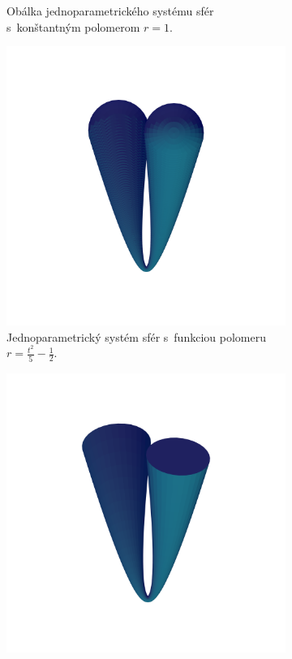 \begin{figure}[h]
\begin{subfigure}[t]{0.49\textwidth}
		\caption{Obálka jednoparametrického systému sfér s~konštantným polomerom $r=1$.}
        \label{fig:plocha2}
    \end{subfigure}
    \hfill
    \begin{subfigure}[t]{0.49\textwidth}
        \centering
        \includegraphics[width=\textwidth, trim=0mm 50mm 0mm 50mm, clip=true]{images/bienert_function_radius_spheres.png}
        	\caption{Jednoparametrický systém sfér s~funkciou polomeru $r=\frac{t^2}{5}-\frac{1}{2}$.}
        \label{fig:plocha3}
    \end{subfigure}
    \hfill
    \begin{subfigure}[t]{0.49\textwidth}
        \centering
        \includegraphics[width=\textwidth, trim=0mm 50mm 0mm 50mm, clip=true]{images/bienert_function_radius_envelope.png}

\end{subfigure}
\end{figure}
